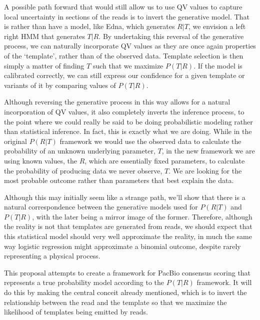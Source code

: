 \documentclass[fleqn,10pt]{SelfArx} %
\begin{document}
A possible path forward that would still allow us to use QV values to capture local uncertainty in sections of the reads is to invert the generative model.  That is rather than have a model, like Edna, which generates $R|T$, we envision a left right HMM that generates $T|R$.  By undertaking this reversal of the generative process, we can naturally incorporate QV values as they are once again properties of the `template', rather than of the observed data.  Template selection is then simply a matter of finding $T$ such that we maximize $P(T|R)$.  If the model is calibrated correctly, we can still express our confidence for a given template or variants of it by comparing values of $P(T|R)$.

Although reversing the generative process in this way allows for a natural incorporation of QV values, it also completely inverts the inference process, to the point where we could really be said to be doing probabilistic modeling rather than statistical inference.  In fact, this is exactly what we are doing.  While in the original $P(R|T)$ framework we would use the observed data to calculate the probability of an unknown underlying parameter, $T$, in the new framework we are using known values, the $R$, which are essentially fixed parameters, to calculate the probability of producing data we never observe, $T$.  We are looking for the most probable outcome rather than parameters that best explain the data.

Although this may initially seem like a strange path, we'll show that there is a natural correspondence between the generative models used for $P(R|T)$ and $P(T|R)$, with the later being a mirror image of the former.  Therefore, although the reality is not that templates are generated from reads, we should expect that this statistical model should very well approximate the reality, in much the same way logistic regression might approximate a binomial outcome, despite rarely representing a physical process.

This proposal attempts to create a framework for PacBio consensus scoring that represents a true probability model according to the $P(T|R)$ framework.  It will do this by making the central conceit already mentioned, which is to invert the relationship between the read and the template so that we maximize the likelihood of templates being emitted by reads.
\end{document}
